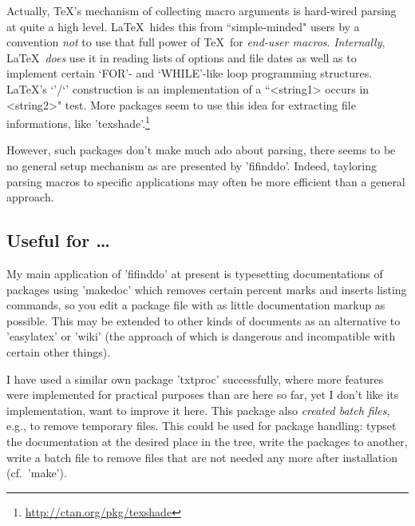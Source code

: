 \documentclass[fleqn]{article}
\begin{document}
Actually, \TeX's mechanism of collecting macro arguments is hard-wired 
parsing at quite a high level. \LaTeX\ hides this from 
``simple-minded" users by a convention \emph{not} to use that full 
power of \TeX\ for \emph{end-user macros}. 
\emph{Internally}, \LaTeX\ \emph{does} use it in reading 
lists of options and file dates as well as to implement certain 
`FOR'- and `WHILE'-like loop programming structures. 
\LaTeX's `\in@'/`\ifin@' construction is an implementation of a 
``<string1> occurs in <string2>" test. More packages seem to use 
this idea for extracting file informations, like 
'texshade'.\footnote{\url{http://ctan.org/pkg/texshade}} 


However, such packages don't make much ado about parsing, 
there seems to be no general setup mechanism as are presented by 
'fifinddo'. Indeed, tayloring parsing macros to specific applications 
may often be more efficient than a general approach. 

\subsection{Useful for \dots}
My main application of 'fifinddo' at present is typesetting 
documentations of packages using 'makedoc' which removes certain 
percent marks and inserts listing commands, so you edit a package file 
with as little documentation markup as possible. 
This may be extended to other kinds of documents as an alternative 
to 'easylatex' or 'wiki' (the approach of which is dangerous and 
incompatible with certain other things).

I have used a similar own package 'txtproc' successfully, 
where more features were implemented for practical purposes 
than are here so far, yet I don't like its implementation, want to 
improve it here. This package also \emph{created batch files}, e.g., 
to remove temporary files.
This could be used for package handling: 
typset the documentation at the desired place in the tree, 
write the packages to another, write a batch file to remove 
files that are not needed any more after installation
(cf.\ 'make'). %
\end{document}
